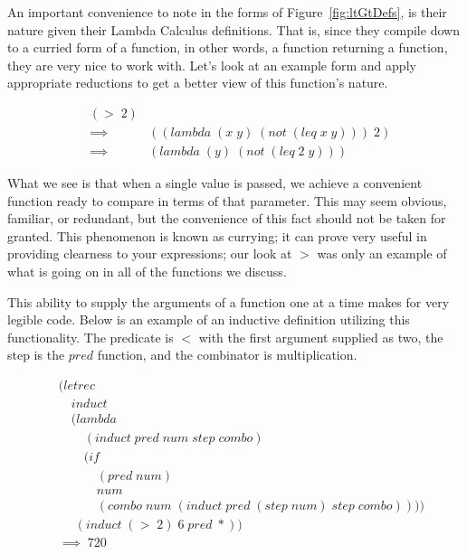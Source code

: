 An important convenience to note in the forms of Figure~\ref{fig:ltGtDefs}, is
their nature given their Lambda Calculus definitions. That is, since they
compile down to a curried form of a function, in other words, a function
returning a function, they are very nice to work with. Let's look at an example
form and apply appropriate reductions to get a better view of this function's
nature.

\begin{figure}[htp]
\caption{}\label{fig:gtNature}
\begin{align*}
& (> \; 2)
\\& \implies \; &((lambda \; (x \; y) \; (not \; (leq \; x \; y))) \; 2)
\\& \implies \; &(lambda \; (y) \; (not \; (leq \; 2 \; y))) \; 
\end{align*}
\end{figure}

What we see is that when a single value is passed, we achieve a convenient 
function ready to compare in terms of that parameter. This may seem obvious, 
familiar, or redundant, but the convenience of this fact should not be taken for 
granted. This phenomenon is known as currying; it can prove very useful in 
providing clearness to your expressions; our look at $>$ was only an example of 
what is going on in all of the functions we discuss.

This ability to supply the arguments of a function one at a time makes for very 
legible code. Below is an example of an inductive definition utilizing this 
functionality. The predicate is $<$ with the first argument supplied as two, the 
step is the $pred$ function, and the combinator is multiplication.

\begin{figure}[htp]
\caption{}\label{fig:inductiveCalculator}
\begin{align*}
& (letrec \; 
\\& \quad induct \; 
\\& \quad (lambda \; 
\\& \qquad (induct \; pred \; num \; step \; combo) \; 
\\& \qquad (if \; 
\\& \qquad \quad (pred \; num) \; 
\\& \qquad \quad num \; 
\\& \qquad \quad (combo \; num \; (induct \; pred \; (step \; num) \; step \; combo)))) \; 
\\& \quad \; (induct \; (> \; 2) \; 6 \; pred \; *))
\\& \implies \; 720
\end{align*}
\end{figure}

